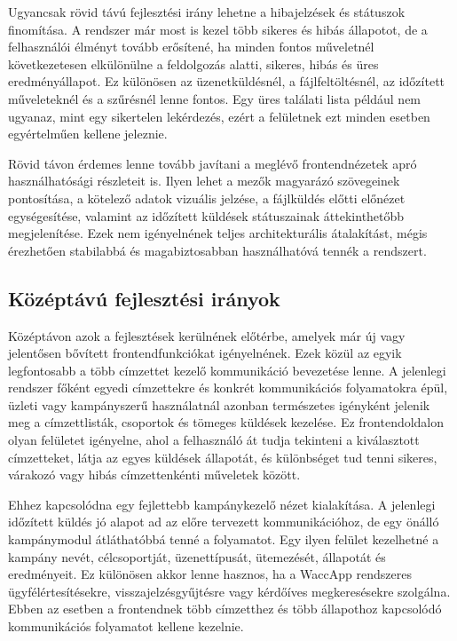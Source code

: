 Ugyancsak rövid távú fejlesztési irány lehetne a hibajelzések és státuszok finomítása. A rendszer már most is kezel több sikeres és hibás állapotot, de a felhasználói élményt tovább erősítené, ha minden fontos műveletnél következetesen elkülönülne a feldolgozás alatti, sikeres, hibás és üres eredményállapot. Ez különösen az üzenetküldésnél, a fájlfeltöltésnél, az időzített műveleteknél és a szűrésnél lenne fontos. Egy üres találati lista például nem ugyanaz, mint egy sikertelen lekérdezés, ezért a felületnek ezt minden esetben egyértelműen kellene jeleznie.

Rövid távon érdemes lenne tovább javítani a meglévő frontendnézetek apró használhatósági részleteit is. Ilyen lehet a mezők magyarázó szövegeinek pontosítása, a kötelező adatok vizuális jelzése, a fájlküldés előtti előnézet egységesítése, valamint az időzített küldések státuszainak áttekinthetőbb megjelenítése. Ezek nem igényelnének teljes architekturális átalakítást, mégis érezhetően stabilabbá és magabiztosabban használhatóvá tennék a rendszert.

\subsection{Középtávú fejlesztési irányok}

Középtávon azok a fejlesztések kerülnének előtérbe, amelyek már új vagy jelentősen bővített frontendfunkciókat igényelnének. Ezek közül az egyik legfontosabb a több címzettet kezelő kommunikáció bevezetése lenne. A jelenlegi rendszer főként egyedi címzettekre és konkrét kommunikációs folyamatokra épül, üzleti vagy kampányszerű használatnál azonban természetes igényként jelenik meg a címzettlisták, csoportok és tömeges küldések kezelése. Ez frontendoldalon olyan felületet igényelne, ahol a felhasználó át tudja tekinteni a kiválasztott címzetteket, látja az egyes küldések állapotát, és különbséget tud tenni sikeres, várakozó vagy hibás címzettenkénti műveletek között.

Ehhez kapcsolódna egy fejlettebb kampánykezelő nézet kialakítása. A jelenlegi időzített küldés jó alapot ad az előre tervezett kommunikációhoz, de egy önálló kampánymodul átláthatóbbá tenné a folyamatot. Egy ilyen felület kezelhetné a kampány nevét, célcsoportját, üzenettípusát, ütemezését, állapotát és eredményeit. Ez különösen akkor lenne hasznos, ha a WaccApp rendszeres ügyfélértesítésekre, visszajelzésgyűjtésre vagy kérdőíves megkeresésekre szolgálna. Ebben az esetben a frontendnek több címzetthez és több állapothoz kapcsolódó kommunikációs folyamatot kellene kezelnie.

